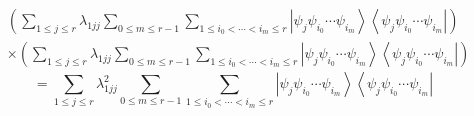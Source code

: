 \documentclass[aps,preprint]{revtex4}%
\begin{document}
\bigskip%
\begin{align}
&  \left(  \sum_{1\leq j\leq r}\lambda_{1jj}\sum_{0\leq m\leq r-1}\sum_{1\leq
i_{0}<\cdots<i_{m}\leq r}\left\vert \psi_{j}\psi_{i_{0}}\cdots\psi_{i_{m}%
}\right\rangle \left\langle \psi_{j}\psi_{i_{0}}\cdots\psi_{i_{m}}\right\vert
\right) \\
&  \times\left(  \sum_{1\leq j\leq r}\lambda_{1jj}\sum_{0\leq m\leq r-1}%
\sum_{1\leq i_{0}<\cdots<i_{m}\leq r}\left\vert \psi_{j}\psi_{i_{0}}\cdots
\psi_{i_{m}}\right\rangle \left\langle \psi_{j}\psi_{i_{0}}\cdots\psi_{i_{m}%
}\right\vert \right)
\end{align}%
\begin{equation}
=\sum_{1\leq j\leq r}\lambda_{1jj}^{2}\sum_{0\leq m\leq r-1}\sum_{1\leq
i_{0}<\cdots<i_{m}\leq r}\left\vert \psi_{j}\psi_{i_{0}}\cdots\psi_{i_{m}%
}\right\rangle \left\langle \psi_{j}\psi_{i_{0}}\cdots\psi_{i_{m}}\right\vert
\end{equation}
%
\end{document}
